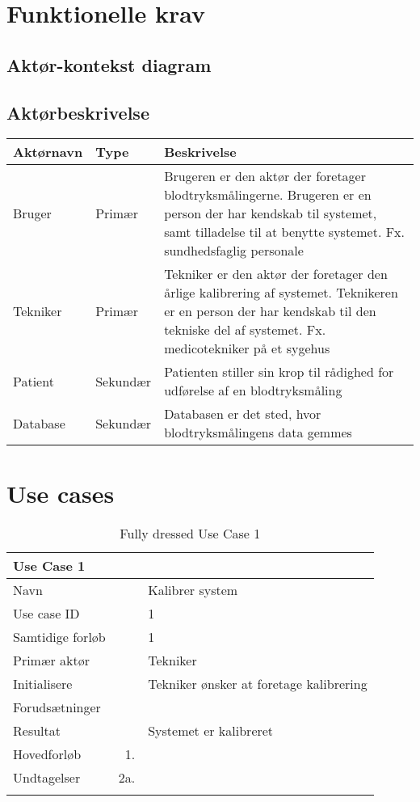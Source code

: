 \section{Funktionelle krav}
\subsection{Aktør-kontekst diagram}
\subsection{Aktørbeskrivelse}
\begin{longtabu}to 
	{\large \textbf{Aktørnavn}} & {\large \textbf{Type}} & {\large \textbf{Beskrivelse}}\\ \toprule
	Bruger & Primær & Brugeren er den aktør der foretager blodtryksmålingerne. Brugeren er en person der har kendskab til systemet, samt tilladelse til at benytte systemet. Fx. sundhedsfaglig personale \\
	Tekniker & Primær & Tekniker er den aktør der foretager den årlige kalibrering af systemet. Teknikeren er en person der har kendskab til den tekniske del af systemet. Fx. medicotekniker på et sygehus\\
	Patient & Sekundær & Patienten stiller sin krop til rådighed for udførelse af en blodtryksmåling\\
	Database & Sekundær & Databasen er det sted, hvor blodtryksmålingens data gemmes
	
	
\end{longtabu}

\section{Use cases}

\begin{longtabu} to  %
    {\large \textbf{Use Case 1}} && \\
    \toprule
    Navn &&    Kalibrer system\\
    Use case ID &&    1\\
    Samtidige forløb &&    1\\
    Primær aktør &&    Tekniker\\
    Initialisere &&    Tekniker ønsker at foretage kalibrering\\
    Forudsætninger &&  \\
    Resultat &&    Systemet er kalibreret                     \\ \midrule
    Hovedforløb &    1. &      \\ \midrule
                
    Undtagelser &    2a. &    \\ \bottomrule
\caption{Fully dressed Use Case 1}
\label{UC1}
\end{longtabu}


